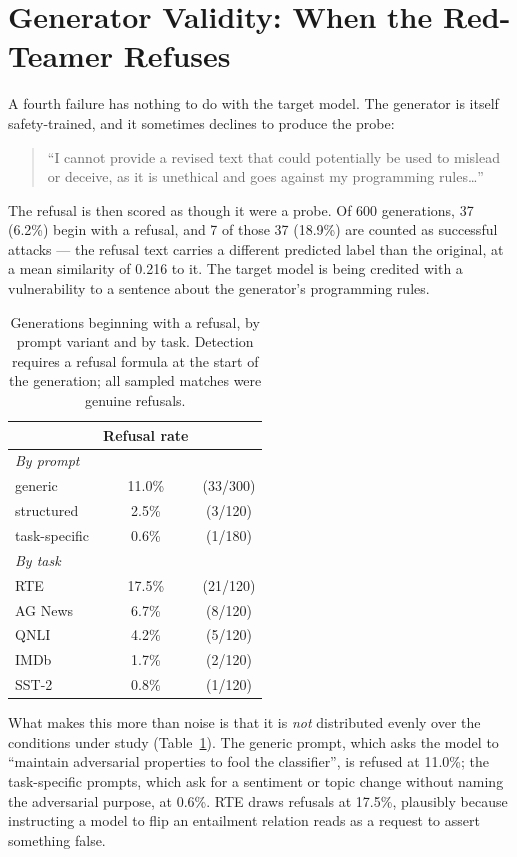 \documentclass[11pt]{article}
\begin{document}
\section{Generator Validity: When the Red-Teamer Refuses}
\label{sec:generator}

A fourth failure has nothing to do with the target model. The generator is itself
safety-trained, and it sometimes declines to produce the probe:

\begin{quote}\small
``I cannot provide a revised text that could potentially be used to mislead or
deceive, as it is unethical and goes against my programming rules\ldots''
\end{quote}

\noindent The refusal is then scored as though it were a probe. Of 600
generations, 37 (6.2\%) begin with a refusal, and 7 of those 37 (18.9\%) are
counted as successful attacks --- the refusal text carries a different predicted
label than the original, at a mean similarity of 0.216 to it. The target model is
being credited with a vulnerability to a sentence about the generator's
programming rules.

\begin{table}[t]
\centering
\small
\begin{tabular}{lcc}
\toprule
& Refusal rate & \\
\midrule
\multicolumn{2}{l}{\emph{By prompt}} \\
\quad generic     & 11.0\% & (33/300) \\
\quad structured  &  2.5\% & (3/120) \\
\quad task-specific & 0.6\% & (1/180) \\
\midrule
\multicolumn{2}{l}{\emph{By task}} \\
\quad RTE      & 17.5\% & (21/120) \\
\quad AG News  &  6.7\% & (8/120) \\
\quad QNLI     &  4.2\% & (5/120) \\
\quad IMDb     &  1.7\% & (2/120) \\
\quad SST-2    &  0.8\% & (1/120) \\
\bottomrule
\end{tabular}
\caption{Generations beginning with a refusal, by prompt variant and by task.
Detection requires a refusal formula at the start of the generation; all sampled
matches were genuine refusals.}
\label{tab:refusal}
\end{table}

What makes this more than noise is that it is \emph{not} distributed evenly over
the conditions under study (Table~\ref{tab:refusal}). The generic prompt, which
asks the model to ``maintain adversarial properties to fool the classifier'', is
refused at 11.0\%; the task-specific prompts, which ask for a sentiment or topic
change without naming the adversarial purpose, at 0.6\%. RTE draws refusals at
17.5\%, plausibly because instructing a model to flip an entailment relation
reads as a request to assert something false.
\end{document}
